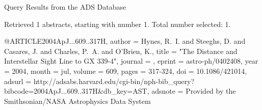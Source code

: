 Query Results from the ADS Database


Retrieved 1 abstracts, starting with number 1.  Total number selected: 1.

@ARTICLE{2004ApJ...609..317H,
   author = {{Hynes}, R.~I. and {Steeghs}, D. and {Casares}, J. and {Charles}, P.~A. and 
	{O'Brien}, K.},
    title = "{The Distance and Interstellar Sight Line to GX 339-4}",
  journal = {\apj},
   eprint = {astro-ph/0402408},
     year = 2004,
    month = jul,
   volume = 609,
    pages = {317-324},
      doi = {10.1086/421014},
   adsurl = {http://adsabs.harvard.edu/cgi-bin/nph-bib_query?bibcode=2004ApJ...609..317H&db_key=AST},
  adsnote = {Provided by the Smithsonian/NASA Astrophysics Data System}
}


